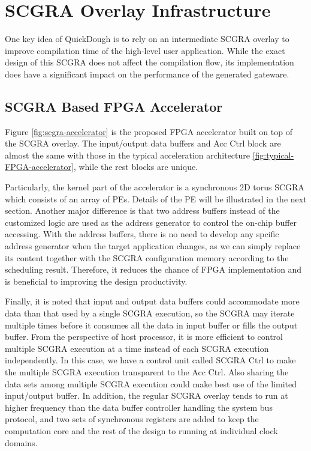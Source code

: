 \section{SCGRA Overlay Infrastructure} \label{sec:scgraimplement}
One key idea of QuickDough is to rely on an intermediate SCGRA overlay to improve compilation time of the high-level user application. While the exact design of this SCGRA does not affect the compilation flow, its implementation does have a significant impact on the performance of the generated gateware.
 
\subsection{SCGRA Based FPGA Accelerator}
Figure \ref{fig:scgra-accelerator} is the proposed FPGA accelerator built on top of the SCGRA overlay. The input/output data buffers and Acc Ctrl block are almost the same with those in the typical acceleration architecture \ref{fig:typical-FPGA-accelerator}, while the rest blocks are unique. 

Particularly, the kernel part of the accelerator is a synchronous 2D torus SCGRA which consists of an array of PEs. Details of the PE will be illustrated in the next section. Another major difference is that two address buffers instead of the customized logic are used as the address generator to control the on-chip buffer accessing. With the address buffers, there is no need to develop any spcific address generator when the target application changes, as we can simply replace its content together with the SCGRA configuration memory according to the scheduling result. Therefore, it reduces the chance of FPGA implementation and is beneficial to improving the design productivity. 

Finally, it is noted that input and output data buffers could accommodate more data than that used by a single SCGRA execution, so the SCGRA may iterate multiple times before it consumes all the data in input buffer or fills the output buffer. From the perspective of host processor, it is more efficient to control multiple SCGRA execution at a time instead of each SCGRA execution independently. In this case, we have a control unit called SCGRA Ctrl to make the multiple SCGRA execution transparent to the Acc Ctrl. Also sharing the data sets among multiple SCGRA execution could make best use of the limited input/output buffer. In addition, the regular SCGRA overlay tends to run at higher frequency than the data buffer controller handling the system bus protocol, and two sets of synchronous registers are added to keep the computation core and the rest of the design to running at individual clock domains.  

